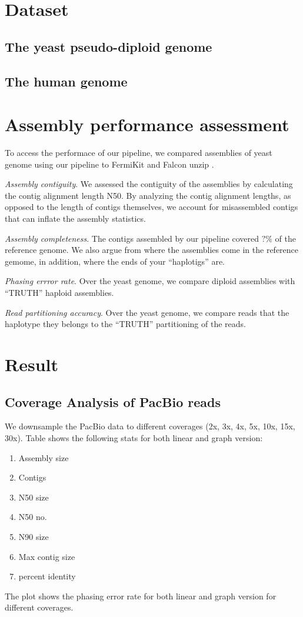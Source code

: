 \section{Dataset}
\subsection{The yeast pseudo-diploid genome}
\subsection{The human genome}

\section{Assembly performance assessment}
To access the performace of our pipeline, we compared assemblies of yeast genome using our pipeline to FermiKit \citep{...} and Falcon unzip \citep{...}.

\textit{Assembly contiguity}. We assessed the contiguity of the assemblies by calculating the contig alignment length N50. 
By analyzing the contig alignment lengths, as opposed to the length of contigs themselves, we account for misassembled contigs that can inflate the assembly statistics.

\textit{Assembly completeness}. The contigs assembled by our pipeline covered $?\%$ of the reference genome. We also argue from where the assemblies come in the reference gemome, in addition, where the ends of your ``haplotigs'' are.

\textit{Phasing errror rate}. Over the yeast genome, we compare diploid assemblies with ``TRUTH'' haploid assemblies.

\textit{Read partitioning accuracy}. Over the yeast genome, we compare reads that the haplotype they belongs to the ``TRUTH'' partitioning of the reads.

\section{Result}

\subsection{Coverage Analysis of PacBio reads}
We downsample the PacBio data to different coverages (2x, 3x, 4x, 5x, 10x, 15x, 30x).
Table shows the following stats for both linear and graph version:
\begin{enumerate}
 \item Assembly size
 \item Contigs
 \item N50 size
 \item N50 no.
 \item N90 size
 \item Max contig size
 \item percent identity
\end{enumerate}

The plot shows the phasing error rate for both linear and graph version for different coverages.












